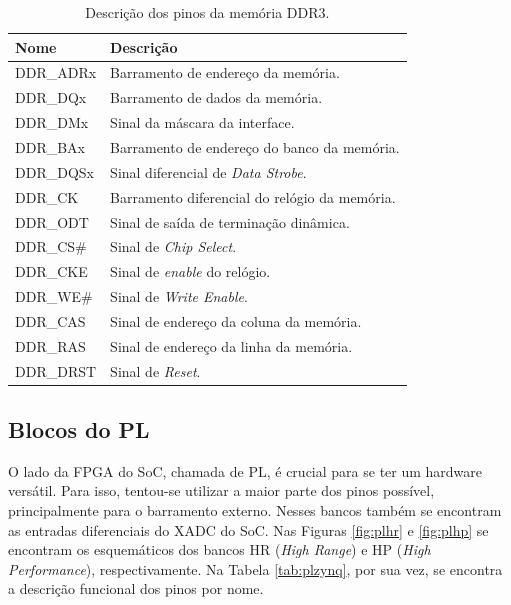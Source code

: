\begin{table}[H]
	\ABNTEXfontereduzida
	\caption{\label{tab:psddr}Descrição dos pinos da memória DDR3.}
    \centering
    \begin{tabular}{@{} >{\centering}p{4cm} >{\centering}p{8cm} @{}}
    
		\toprule
		\textbf{Nome} & \textbf{Descrição} \tabularnewline 
        \midrule
         DDR\_ADRx & Barramento de endereço da memória. \tabularnewline
        \midrule
         DDR\_DQx & Barramento de dados da memória. \tabularnewline
        \midrule
         DDR\_DMx & Sinal da máscara da interface. \tabularnewline
        \midrule
        DDR\_BAx  & Barramento de endereço do banco da memória. \tabularnewline
        \midrule
        DDR\_DQSx  & Sinal diferencial de \textit{Data Strobe}. \tabularnewline
        \midrule
        DDR\_CK & Barramento diferencial do relógio da memória. \tabularnewline
        \midrule
        DDR\_ODT & Sinal de saída de terminação dinâmica. \tabularnewline
        \midrule
        DDR\_CS\# & Sinal de \textit{Chip Select}. \tabularnewline
        \midrule
        DDR\_CKE & Sinal de \textit{enable} do relógio. \tabularnewline
        \midrule
        DDR\_WE\# & Sinal de \textit{Write Enable}. \tabularnewline
        \midrule
        DDR\_CAS & Sinal de endereço da coluna da memória. \tabularnewline
         \midrule
        DDR\_RAS & Sinal de endereço da linha da memória. \tabularnewline
        \midrule
        DDR\_DRST & Sinal de \textit{Reset}. \tabularnewline
        \bottomrule
	\end{tabular}
\end{table}

\subsection{Blocos do PL}

O lado da FPGA do SoC, chamada de PL, é crucial para se ter um hardware versátil. Para isso, tentou-se utilizar a maior parte dos pinos possível, principalmente para o barramento externo. Nesses bancos também se encontram as entradas diferenciais do XADC do SoC. Nas Figuras \ref{fig:plhr} e \ref{fig:plhp} se encontram os esquemáticos dos bancos HR (\textit{High Range}) e HP (\textit{High Performance}), respectivamente. Na Tabela \ref{tab:plzynq}, por sua vez, se encontra a descrição funcional dos pinos por nome.

